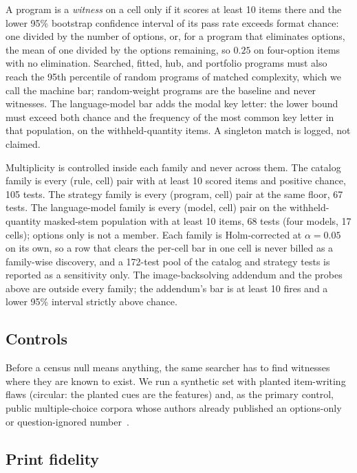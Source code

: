 A program is a \emph{witness} on a cell only if it scores at least 10 items there and the lower 95\% bootstrap confidence interval of its pass rate exceeds format chance: one divided by the number of options, or, for a program that eliminates options, the mean of one divided by the options remaining, so $0.25$ on four-option items with no elimination. Searched, fitted, hub, and portfolio programs must also reach the 95th percentile of random programs of matched complexity, which we call the machine bar; random-weight programs are the baseline and never witnesses. The language-model bar adds the modal key letter: the lower bound must exceed both chance and the frequency of the most common key letter in that population, on the withheld-quantity items. A singleton match is logged, not claimed.

Multiplicity is controlled inside each family and never across them. The catalog family is every (rule, cell) pair with at least 10 scored items and positive chance, 105 tests. The strategy family is every (program, cell) pair at the same floor, 67 tests. The language-model family is every (model, cell) pair on the withheld-quantity masked-stem population with at least 10 items, 68 tests (four models, 17 cells); options only is not a member. Each family is Holm-corrected at $\alpha=0.05$ on its own, so a row that clears the per-cell bar in one cell is never billed as a family-wise discovery, and a 172-test pool of the catalog and strategy tests is reported as a sensitivity only. The image-backsolving addendum and the probes above are outside every family; the addendum's bar is at least 10 fires and a lower 95\% interval strictly above chance.

\subsection{Controls}
\label{sec:controls-method}

Before a census null means anything, the same searcher has to find witnesses where they are known to exist. We run a synthetic set with planted item-writing flaws (circular: the planted cues are the features) and, as the primary control, public multiple-choice corpora whose authors already published an options-only or question-ignored number~\cite{mihaylov-etal-2018-suit,zellers-etal-2018-swag,lai-etal-2017-race,talmor-etal-2019-commonsenseqa}.

\subsection{Print fidelity}
\label{sec:fidelity-method}


